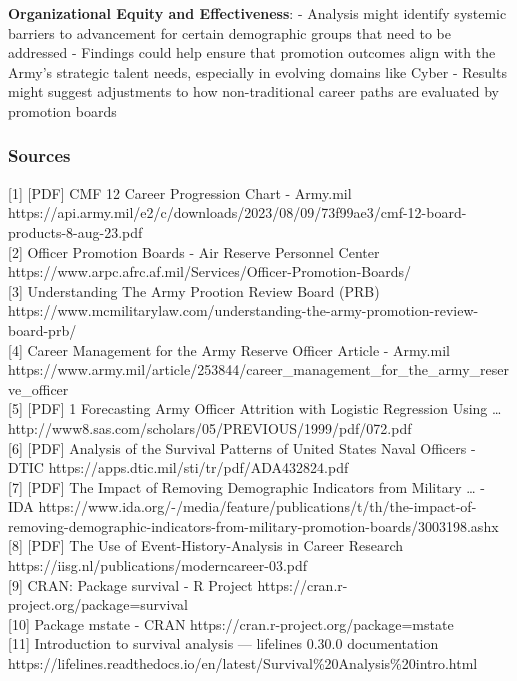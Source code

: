 \documentclass[./main.tex]{subfiles}
\begin{document}
\textbf{Organizational Equity and Effectiveness}: - Analysis might
identify systemic barriers to advancement for certain demographic groups
that need to be addressed - Findings could help ensure that promotion
outcomes align with the Army's strategic talent needs, especially in
evolving domains like Cyber - Results might suggest adjustments to how
non-traditional career paths are evaluated by promotion boards

\subsubsection{Sources}\label{sources}

{[}1{]} {[}PDF{]} CMF 12 Career Progression Chart - Army.mil
https://api.army.mil/e2/c/downloads/2023/08/09/73f99ae3/cmf-12-board-products-8-aug-23.pdf\\
{[}2{]} Officer Promotion Boards - Air Reserve Personnel Center
https://www.arpc.afrc.af.mil/Services/Officer-Promotion-Boards/\\
{[}3{]} Understanding The Army Prootion Review Board (PRB)
https://www.mcmilitarylaw.com/understanding-the-army-promotion-review-board-prb/\\
{[}4{]} Career Management for the Army Reserve Officer \textbar{}
Article - Army.mil
https://www.army.mil/article/253844/career\_management\_for\_the\_army\_reserve\_officer\\
{[}5{]} {[}PDF{]} 1 Forecasting Army Officer Attrition with Logistic
Regression Using \ldots{}
http://www8.sas.com/scholars/05/PREVIOUS/1999/pdf/072.pdf\\
{[}6{]} {[}PDF{]} Analysis of the Survival Patterns of United States
Naval Officers - DTIC https://apps.dtic.mil/sti/tr/pdf/ADA432824.pdf\\
{[}7{]} {[}PDF{]} The Impact of Removing Demographic Indicators from
Military \ldots{} - IDA
https://www.ida.org/-/media/feature/publications/t/th/the-impact-of-removing-demographic-indicators-from-military-promotion-boards/3003198.ashx\\
{[}8{]} {[}PDF{]} The Use of Event-History-Analysis in Career Research
https://iisg.nl/publications/moderncareer-03.pdf\\
{[}9{]} CRAN: Package survival - R Project
https://cran.r-project.org/package=survival\\
{[}10{]} Package mstate - CRAN
https://cran.r-project.org/package=mstate\\
{[}11{]} Introduction to survival analysis --- lifelines 0.30.0
documentation
https://lifelines.readthedocs.io/en/latest/Survival\%20Analysis\%20intro.html\\
\end{document}
